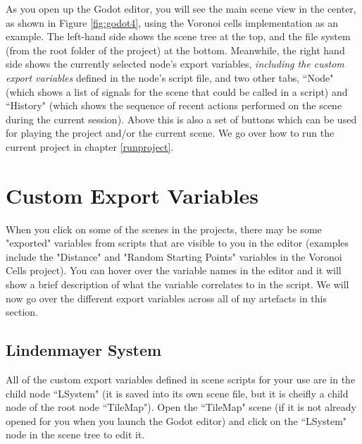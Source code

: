 As you open up the Godot editor, you will see the main scene view in the center, as shown in Figure \ref{fig:godot4}, using the Voronoi cells implementation as an example. The left-hand side shows the scene tree at the top, and the file system (from the root folder of the project) at the bottom. Meanwhile, the right hand side shows the currently selected node's export variables, \textit{including the custom export variables} defined in the node's script file, and two other tabs, ``Node" (which shows a list of signals for the scene that could be called in a script) and ``History" (which shows the sequence of recent actions performed on the scene during the current session). Above this is also a set of buttons which can be used for playing the project and/or the current scene. We go over how to run the current project in chapter \ref{runproject}.

\section{Custom Export Variables} 

When you click on some of the scenes in the projects, there may be some "exported" variables from scripts that are visible to you in the editor (examples include the "Distance" and "Random Starting Points" variables in the Voronoi Cells project). You can hover over the variable names in the editor and it will show a brief description of what the variable correlates to in the script. We will now go over the different export variables across all of my artefacts in this section.

\subsection{Lindenmayer System}

All of the custom export variables defined in scene scripts for your use are in the child node ``LSystem" (it is saved into its own scene file, but it is cheifly a child node of the root node ``TileMap"). Open the ``TileMap" scene (if it is not already opened for you when you launch the Godot editor) and click on the ``LSystem" node in the scene tree to edit it.

